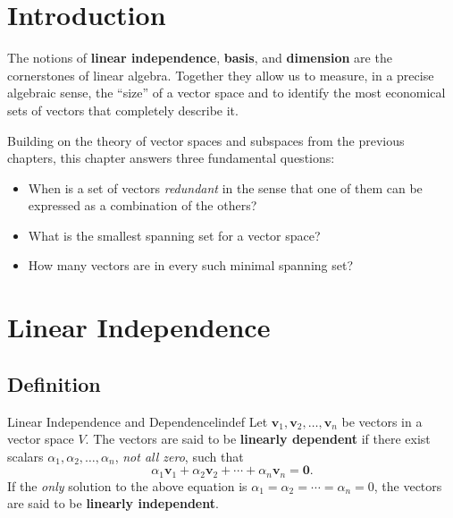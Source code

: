 \documentclass[12pt,a4paper]{article}
\newcommand{\vv}[1]{\mathbf{#1}}
\newcommand{\vzero}{\mathbf{0}}
\begin{document}
		\tableofcontents
		\newpage
		
		\section{Introduction}
		
		The notions of \textbf{linear independence}, \textbf{basis}, and
		\textbf{dimension} are the cornerstones of linear algebra.  Together they allow
		us to measure, in a precise algebraic sense, the ``size'' of a vector space and
		to identify the most economical sets of vectors that completely describe it.
		
		Building on the theory of vector spaces and subspaces from the previous chapters,
		this chapter answers three fundamental questions:
		
		\begin{itemize}[leftmargin=2em, itemsep=0.4em]
			\item When is a set of vectors \emph{redundant} in the sense that one of them
			can be expressed as a combination of the others?
			\item What is the smallest spanning set for a vector space?
			\item How many vectors are in every such minimal spanning set?
		\end{itemize}
		
		\section{Linear Independence}
		\label{sec:lindep}
		
		\subsection{Definition}
		
		\begin{definition}{Linear Independence and Dependence}{lindef}
			Let $\vv{v}_1, \vv{v}_2, \ldots, \vv{v}_n$ be vectors in a vector space $V$.
			The vectors are said to be \textbf{linearly dependent} if there exist scalars
			$\alpha_1, \alpha_2, \ldots, \alpha_n$, \emph{not all zero}, such that
			\[
			\alpha_1\vv{v}_1 + \alpha_2\vv{v}_2 + \cdots + \alpha_n\vv{v}_n = \vzero.
			\]
			If the \emph{only} solution to the above equation is
			$\alpha_1 = \alpha_2 = \cdots = \alpha_n = 0$, the vectors are said to be
			\textbf{linearly independent}.
		\end{definition}
		
\end{document}
